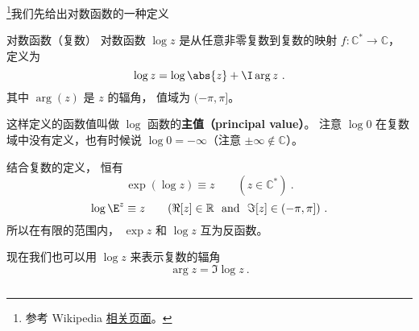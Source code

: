 
\begin{issues}
\issueDraft
\end{issues}


\footnote{参考 Wikipedia \href{https://en.wikipedia.org/wiki/Complex_logarithm}{相关页面}。}我们先给出对数函数的一种定义
\begin{definition}{对数函数（复数）}
对数函数 $\log z$ 是从任意非零复数到复数的映射 $f:\mathbb C^*\to \mathbb C$， 定义为
\begin{equation}
\log z = \log\abs{z} + \I \arg z~.
\end{equation}
其中 $\arg(z)$ 是 $z$ 的辐角， 值域为 $(-\pi, \pi]$。
\end{definition}
这样定义的函数值叫做 $\log$ 函数的\textbf{主值（principal value）}。 注意 $\log 0$ 在复数域中没有定义，也有时候说 $\log 0 = -\infty$（注意 $\pm\infty \notin \mathbb C$）。

结合复数的定义， 恒有
\begin{equation}
\exp(\log z) \equiv z \qquad (z \in \mathbb C^*)~.
\end{equation}
\begin{equation}
\log \E^z \equiv z \qquad (\Re[z]\in\mathbb R\ \text{ and }\ \Im[z]\in(-\pi, \pi])~.
\end{equation}
所以在有限的范围内， $\exp z$ 和 $\log z$ 互为反函数。

现在我们也可以用 $\log z$ 来表示复数的辐角
\begin{equation}
\arg z = \Im\log z~.
\end{equation}

\begin{equation}

\end{equation}
